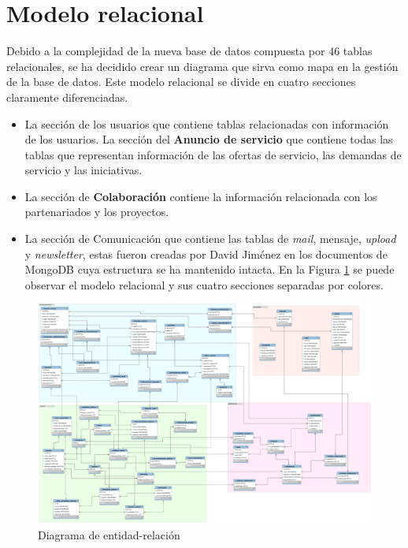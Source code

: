 \documentclass[11pt]{book}
\begin{document}
	\section{Modelo relacional}\label{cap:mod-relacional}
	Debido a la complejidad de la nueva base de datos compuesta por 46 tablas relacionales, se ha decidido crear un diagrama que sirva como mapa en la gestión de la base de datos. Este modelo relacional se divide en cuatro secciones claramente diferenciadas.
	\begin{itemize} 
		\item La sección de los usuarios que contiene tablas relacionadas con información de los usuarios. La sección del \textbf{Anuncio de servicio} que contiene todas las tablas que representan información de las ofertas de servicio, las demandas de servicio y las iniciativas.
		\item La sección de \textbf{Colaboración} contiene la información relacionada con los partenariados y los proyectos.
		\item La sección de Comunicación que contiene las tablas de \textit{mail}, mensaje, \textit{upload} y \textit{newsletter}, estas fueron creadas por David Jiménez en los documentos de MongoDB cuya estructura se ha mantenido intacta.
		En la Figura \ref{fig:relacional} se puede observar el modelo relacional y sus cuatro secciones separadas por colores.
	\end{itemize}
	\begin{landscape}
		\begin{figure}[p]
			\centering
			\includegraphics[scale=0.25]{er}
			\caption{Diagrama de entidad-relación}
			\label{fig:relacional}
		\end{figure}
	\end{landscape}
	
\end{document}
